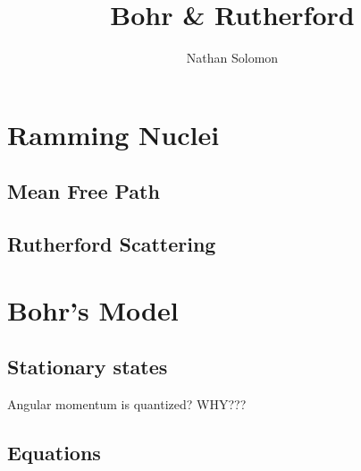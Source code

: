\documentclass[12pt]{article}
\begin{document}
\title{Bohr \& Rutherford}
\author{Nathan Solomon}
\maketitle

\section{Ramming Nuclei}
\subsection{Mean Free Path}

\subsection{Rutherford Scattering}

\section{Bohr's Model}
\subsection{Stationary states}
Angular momentum is quantized? WHY???
\subsection{Equations}
\end{document}
